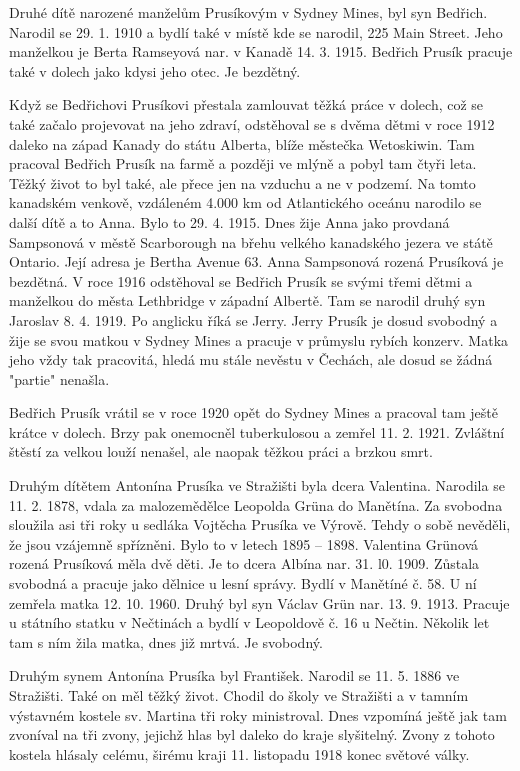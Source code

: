 \documentclass[../dejiny-rodu-prusiku.tex]{subfiles}
\begin{document}
Druhé dítě narozené manželům Prusíkovým v Sydney Mines, byl syn Bedřich. Narodil se 29. 1. 1910 a bydlí také v místě kde se narodil, 225 Main Street. Jeho manželkou je Berta Ramseyová nar. v Kanadě 14. 3. 1915. Bedřich Prusík pracuje také v dolech jako kdysi jeho otec. Je bezdětný.

Když se Bedřichovi Prusíkovi přestala zamlouvat těžká práce v dolech, což se také začalo projevovat na jeho zdraví, odstěhoval se s dvěma dětmi v roce 1912 daleko na západ Kanady do státu Alberta, blíže městečka Wetoskiwin. Tam pracoval Bedřich Prusík na farmě a později ve mlýně a pobyl tam čtyři leta. Těžký život to byl také, ale přece jen na vzduchu a ne v podzemí. Na tomto kanadském venkově, vzdáleném 4.000 km od Atlantického oceánu narodilo se další dítě a to Anna. Bylo to 29. 4. 1915. Dnes žije Anna jako provdaná Sampsonová v městě Scarborough na břehu velkého kanadského jezera ve státě Ontario. Její adresa je Bertha Avenue 63. Anna Sampsonová rozená Prusíková je bezdětná. V roce 1916 odstěhoval se Bedřich Prusík se svými třemi dětmi a manželkou do města Lethbridge v západní Albertě. Tam se narodil druhý syn Jaroslav 8. 4. 1919. Po anglicku říká se Jerry. Jerry Prusík je dosud svobodný a žije se svou matkou v Sydney Mines a pracuje v průmyslu rybích konzerv. Matka jeho vždy tak pracovitá, hledá mu stále nevěstu v Čechách, ale dosud se žádná "partie" nenašla.

Bedřich Prusík vrátil se v roce 1920 opět do Sydney Mines a pracoval tam ještě krátce v dolech. Brzy pak onemocněl tuberkulosou a zemřel 11. 2. 1921. Zvláštní štěstí za velkou louží nenašel, ale naopak těžkou práci a brzkou smrt.

Druhým dítětem Antonína Prusíka ve Stražišti byla dcera Valentina. Narodila se 11. 2. 1878, vdala za malozemědělce Leopolda Grüna  do Manětína. Za svobodna sloužila asi tři roky u sedláka Vojtěcha Prusíka ve Výrově. Tehdy o sobě nevěděli, že jsou vzájemně spřízněni. Bylo to v letech 1895 – 1898. Valentina Grünová rozená Prusíková měla dvě děti. Je to dcera Albína nar. 31. l0. 1909. Zůstala svobodná a pracuje jako dělnice u lesní správy. Bydlí
v Manětíné č. 58. U ní zemřela matka 12. 10. 1960. Druhý byl syn Václav Grün nar. 13. 9. 1913. Pracuje u státního statku v Nečtinách a bydlí v Leopoldově č. 16 u Nečtin. Několik let tam s ním žila matka, dnes již mrtvá. Je svobodný.

Druhým synem Antonína Prusíka byl František. Narodil se 11. 5. 1886 ve Stražišti. Také on měl těžký život. Chodil do školy ve Stražišti a v tamním výstavném kostele sv. Martina tři roky ministroval. Dnes vzpomíná ještě jak tam zvoníval na tři zvony, jejichž hlas byl daleko do kraje slyšitelný. Zvony z tohoto kostela hlásaly celému, širému kraji 11. listopadu 1918 konec světové války.
\end{document}
